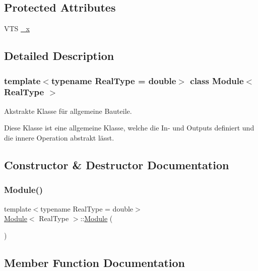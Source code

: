 \subsection*{Protected Attributes}
\begin{DoxyCompactItemize}
\item 
V\+TS \mbox{\hyperlink{class_module_a9216c72f81ec2827dad07d3e6752af6e}{\+\_\+x}}
\end{DoxyCompactItemize}


\subsection{Detailed Description}
\subsubsection*{template$<$typename Real\+Type = double$>$\newline
class Module$<$ Real\+Type $>$}

Akstrakte Klasse für allgemeine Bauteile. 

Diese Klasse ist eine allgemeine Klasse, welche die In-\/ und Outputs definiert und die innere Operation abstrakt lässt. 

\subsection{Constructor \& Destructor Documentation}
\mbox{\label{class_module_a1ca1033f86253716d23f1fc6e4152ce8}} 
\subsubsection{\texorpdfstring{Module()}{Module()}}
{\footnotesize\ttfamily template$<$typename Real\+Type  = double$>$ \\
\mbox{\hyperlink{class_module}{Module}}$<$ Real\+Type $>$\+::\mbox{\hyperlink{class_module}{Module}} (\begin{DoxyParamCaption}{ }\end{DoxyParamCaption})\hspace{0.3cm}{\ttfamily [inline]}}



\subsection{Member Function Documentation}
\mbox{\label{class_module_ad28dc7d3309858af1011b60b53c51c1a}} 
